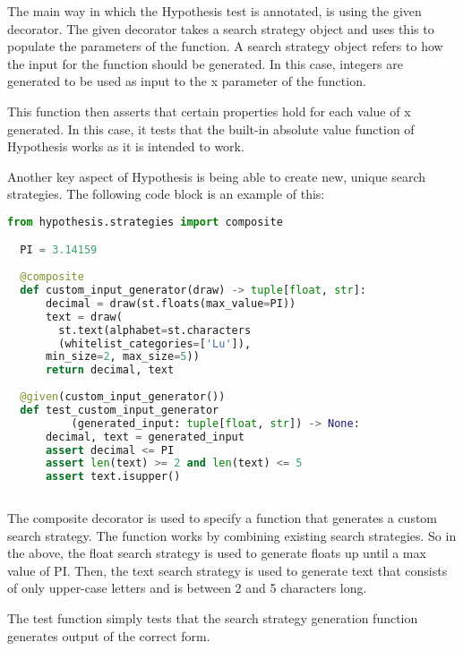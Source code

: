 \documentclass[runningheads]{llncs}
\begin{document}
The main way in which the Hypothesis test is annotated, is using the given decorator. The given decorator takes a search strategy object
and uses this to populate the parameters of the function. A search strategy object refers to how the input for the function should be generated.
In this case, integers are generated to be used as input to the x parameter of the function.

This function then asserts that certain properties hold for each value of x generated. In this case, it tests that the built-in absolute value function of Hypothesis works
as it is intended to work.

Another key aspect of Hypothesis is being able to create new, unique search strategies. The following code block
is an example of this:

\begin{lstlisting}[language=Python]
  from hypothesis.strategies import composite

  PI = 3.14159
  
  @composite
  def custom_input_generator(draw) -> tuple[float, str]:
      decimal = draw(st.floats(max_value=PI))
      text = draw(
        st.text(alphabet=st.characters
        (whitelist_categories=['Lu']), 
      min_size=2, max_size=5))
      return decimal, text
  
  @given(custom_input_generator())
  def test_custom_input_generator
          (generated_input: tuple[float, str]) -> None:
      decimal, text = generated_input
      assert decimal <= PI
      assert len(text) >= 2 and len(text) <= 5
      assert text.isupper()
  
\end{lstlisting}

The composite decorator is used to specify a function that generates a custom search strategy.
The function works by combining existing search strategies. So in the above, the float search strategy
is used to generate floats up until a max value of PI. Then, the text search strategy is used to generate text
that consists of only upper-case letters and is between 2 and 5 characters long.

The test function simply tests that the search strategy generation function generates output of the correct form.

\end{document}
